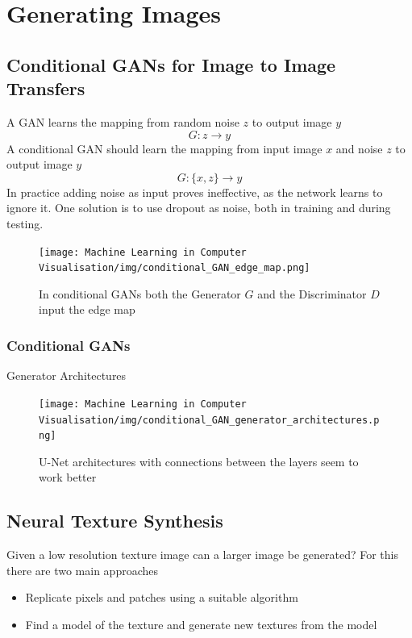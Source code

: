 \documentclass[x11names,11pt,a4paper]{article}
\theoremstyle{definition}
\begin{document}
\section{Generating Images}

\subsection{Conditional GANs for Image to Image Transfers}
A GAN learns the mapping from random noise $z$ to output image $y$
\begin{equation*}
	G: z \rightarrow y
\end{equation*}
A conditional GAN should learn the mapping from input image $x$ and noise $z$ to output image $y$
\begin{equation*}
	G: \{x,z\} \rightarrow y
\end{equation*}
In practice adding noise as input proves ineffective, as the network learns to ignore it. One solution is to use dropout as noise, both in training and during testing.
\begin{figure}[H]
	\centering
	\texttt{[image: Machine Learning in Computer Visualisation/img/conditional\_GAN\_edge\_map.png]}
	\caption{In conditional GANs both the Generator $G$ and the Discriminator $D$ input the edge map}
	\label{fig:conditionalganedgemap}
\end{figure}

\subsubsection{Conditional GANs}
Generator Architectures
\begin{figure}[H]
	\centering
	\texttt{[image: Machine Learning in Computer Visualisation/img/conditional\_GAN\_generator\_architectures.png]}
	\caption{U-Net architectures with connections between the layers seem to work better}
	\label{fig:conditionalgangeneratorarchitectures}
\end{figure}

\subsection{Neural Texture Synthesis}
Given a low resolution texture image can a larger image be generated? For this there are two main approaches
\begin{itemize}[label=-]
	\item Replicate pixels and patches using a suitable algorithm
	\item Find a model of the texture and generate new textures from the model
\end{itemize}
\end{document}
